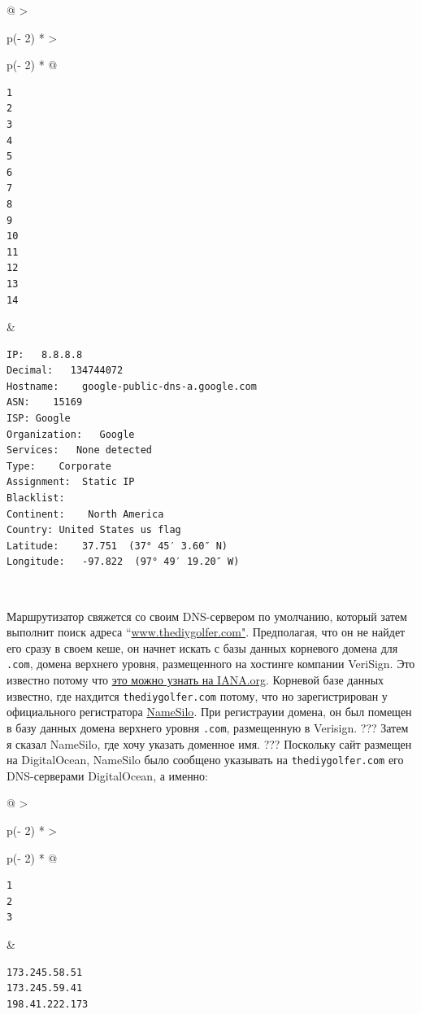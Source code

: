 \documentclass{report}
\begin{document}
\begin{longtable}[]{@{}
  >{\raggedright\arraybackslash}p{(\columnwidth - 2\tabcolsep) * }
  >{\raggedright\arraybackslash}p{(\columnwidth - 2\tabcolsep) * }@{}}
\toprule
\endhead
\begin{minipage}[t]{\linewidth}\raggedright
\begin{verbatim}
1
2
3
4
5
6
7
8
9
10
11
12
13
14
\end{verbatim}
\end{minipage} & \begin{minipage}[t]{\linewidth}\raggedright
\begin{verbatim}
IP:   8.8.8.8
Decimal:   134744072
Hostname:    google-public-dns-a.google.com
ASN:    15169
ISP: Google
Organization:   Google
Services:   None detected
Type:    Corporate
Assignment:  Static IP
Blacklist:
Continent:    North America
Country: United States us flag
Latitude:    37.751  (37° 45′ 3.60″ N)
Longitude:   -97.822  (97° 49′ 19.20″ W)
\end{verbatim}
\end{minipage} \\ \addlinespace
\bottomrule
\end{longtable}

Маршрутизатор свяжется со своим DNS-сервером по умолчанию, который затем
выполнит поиск адреса
``\href{http://www.thediygolfer.com}{www.thediygolfer.com"}.
Предполагая, что он не найдет его сразу в своем кеше, он начнет искать с
базы данных корневого домена для \texttt{.com}, домена верхнего уровня,
размещенного на хостинге компании VeriSign. Это известно потому что
\href{https://www.iana.org/domains/root/db/com.html}{это можно узнать на
IANA.org}. Корневой базе данных известно, где нахдится
\texttt{thediygolfer.com} потому, что но зарегистрирован у официального
регистратора
\href{https://www.namesilo.com/register.php?rid=21c9e40dd}{NameSilo}.
При регистрауии домена, он был помещен в базу данных домена верхнего
уровня \texttt{.com}, размещенную в Verisign. ??? Затем я сказал
NameSilo, где хочу указать доменное имя. ??? Поскольку сайт размещен на
DigitalOcean, NameSilo было сообщено указывать на
\texttt{thediygolfer.com} его DNS-серверами DigitalOcean, а именно:

\begin{longtable}[]{@{}
  >{\raggedright\arraybackslash}p{(\columnwidth - 2\tabcolsep) * }
  >{\raggedright\arraybackslash}p{(\columnwidth - 2\tabcolsep) * }@{}}
\toprule
\endhead
\begin{minipage}[t]{\linewidth}\raggedright
\begin{verbatim}
1
2
3
\end{verbatim}
\end{minipage} & \begin{minipage}[t]{\linewidth}\raggedright
\begin{verbatim}
173.245.58.51
173.245.59.41
198.41.222.173
\end{verbatim}
\end{minipage} \\ \addlinespace
\bottomrule
\end{longtable}
\end{document}
